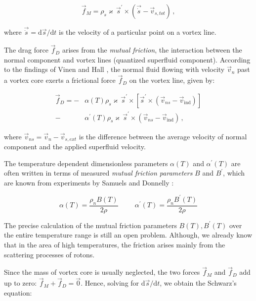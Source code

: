 \begin{equation}
\vec{f}_M = \rho_s \varkappa \,\vec{s}^{\prime} \times (\vec{\dot{s}} - \vec{v}_{s,tot})\,,
\label{magnus}
\end{equation}

where $\vec{\dot{s}} = \text{d}\vec{s} / \text{d} t$ is the velocity of a particular point on a vortex line.

The drag force $\vec{f}_D$ arises from the \textit{mutual friction}, the interaction between the normal component and vortex lines (quantized superfluid component). According to the findings of Vinen and Hall \cite{vinen}, the normal fluid flowing with velocity $\vec{v}_n$ past a vortex core exerts a frictional force $\vec{f}_D$ on the vortex line, given by:

\begin{align}
\vec{f}_D = -& \alpha(T)\rho_s\varkappa\,\vec{s}^{\prime} \times [\vec{s}^{\prime} \times (\vec{v}_{ns} - \vec{v}_{\text{ind}})]
\label{alpha1}
\\
-& \alpha^{\prime}(T)\rho_s\varkappa\,\vec{s}^{\prime} \times (\vec{v}_{ns} - \vec{v}_{\text{ind}})
\,,
\label{alpha2}
\end{align}

where $\vec{v}_{ns} = \vec{v}_{n} - \vec{v}_{s,ext}$ is the difference between the average velocity of normal component and the applied superfluid velocity.

The temperature dependent dimensionless parameters $\alpha(T)$ and $\alpha^{\prime}(T)$ are often written in terms of measured \textit{mutual friction parameters} $B$ and $B^{\prime}$, which are known from experiments by Samuels and Donnelly \cite{donnelly}:

\begin{equation}
\alpha(T) = \frac{\rho_n B(T)}{2\rho}
\hspace{1cm}
\alpha^{\prime}(T) = \frac{\rho_n B^{\prime}(T)}{2\rho}
\end{equation}

The precise calculation of the mutual friction parameters $B(T), B^{\prime}(T)$ over the entire temperature range is still an open problem. Although, we already know that in the area of high temperatures, the friction arises mainly from the scattering processes of rotons.

\newpage

Since the mass of vortex core is usually neglected, the two forces $\vec{f}_M$ and $\vec{f}_D$ add up to zero: $\vec{f}_M + \vec{f}_D = \vec{0}$. Hence, solving for $\text{d}\vec{s} / \text{d} t$, we obtain \cite{schwarz} the Schwarz's equation:

